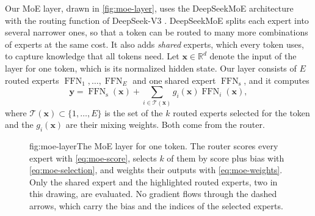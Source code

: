 Our MoE layer, drawn in \cref{fig:moe-layer}, uses the DeepSeekMoE architecture \cite{dai2024deepseekmoe} with the routing function of DeepSeek-V3 \cite{deepseek2024v3}. DeepSeekMoE splits each expert into several narrower ones, so that a token can be routed to many more combinations of experts at the same cost. It also adds \emph{shared} experts, which every token uses, to capture knowledge that all tokens need. Let $\mathbf{x} \in \mathbb{R}^{d}$ denote the input of the layer for one token, which is its normalized hidden state. Our layer consists of $E$ routed experts $\operatorname{FFN}_1, \dots, \operatorname{FFN}_E$ and one shared expert $\operatorname{FFN}_{\mathrm{s}}$, and it computes
\begin{equation}[eq:moe-output]{}
  \mathbf{y} = \operatorname{FFN}_{\mathrm{s}}(\mathbf{x}) + \sum_{i \in \mathcal{T}(\mathbf{x})} g_i(\mathbf{x}) \operatorname{FFN}_i(\mathbf{x}),
\end{equation}
where $\mathcal{T}(\mathbf{x}) \subset \{1, \dots, E\}$ is the set of the $k$ routed experts selected for the token and the $g_i(\mathbf{x})$ are their mixing weights. Both come from the router.

\begin{figure}[The MoE layer for one token]{fig:moe-layer}{The MoE layer for one token. The router scores every expert with \cref{eq:moe-score}, selects $k$ of them by score plus bias with \cref{eq:moe-selection}, and weights their outputs with \cref{eq:moe-weights}. Only the shared expert and the highlighted routed experts, two in this drawing, are evaluated. No gradient flows through the dashed arrows, which carry the bias and the indices of the selected experts.}
  
\end{figure}

